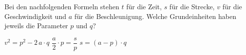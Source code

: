Bei den nachfolgenden Formeln stehen $t$ für die Zeit, $s$ für die Strecke, $v$ für die Geschwindigkeit und $a$ für die Beschleunigung. Welche Grundeinheiten haben jeweils die Parameter $p$ und $q$?

\begin{abcliste}
\abc $v^2 = p^2 - 2\,a\cdot q$
\abc $\dfrac{a}{2}\cdot p = \dfrac{s}{p}$
\abc $s = (a - p)\cdot q$
\end{abcliste}
